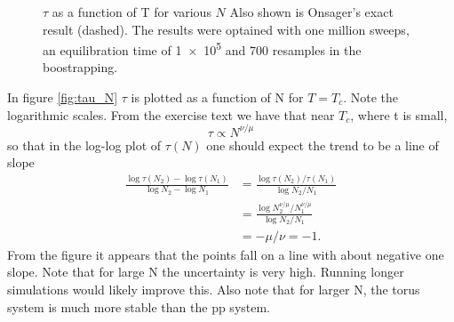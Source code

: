 \documentclass[12pt, a4paper]{article}
\begin{document}
\begin{figure}[H]
  \centering
  \caption{$\tau$ as a function of T for various $N$
    Also shown is Onsager's exact result (dashed).
    The results were optained with one million sweeps, an equilibration time of \num{1e5} and 700 resamples in the boostrapping.
    \label{fig:tau_T}}
\end{figure}


In figure \ref{fig:tau_N} $\tau$ is plotted as a function of N for $T = T_c$.
Note the logarithmic scales.
From the exercise text we have that near $T_c$, where t is small,
\begin{equation}
  \tau \propto N^{\nu/\mu}
\end{equation}
so that in the log-log plot of $\tau(N)$ one should expect the trend to be a line of slope
\begin{align}
  \frac{\log\tau(N_2) - \log\tau(N_1)}{\log N_2 - \log N_1}
  &= \frac{\log \tau(N_2)/\tau(N_1)}{\log N_2/N_1} \\
  &= \frac{\log N_2^{\nu/\mu}/N_1^{\nu/\mu}}{\log N_2/N_1}\\
  &= -\mu/\nu = -1.
\end{align}
From the figure it appears that the points fall on a line with about negative one slope.
Note that for large N the uncertainty is very high.
Running longer simulations would likely improve this.
Also note that for larger N, the torus system is much more stable than the pp system.
\end{document}
